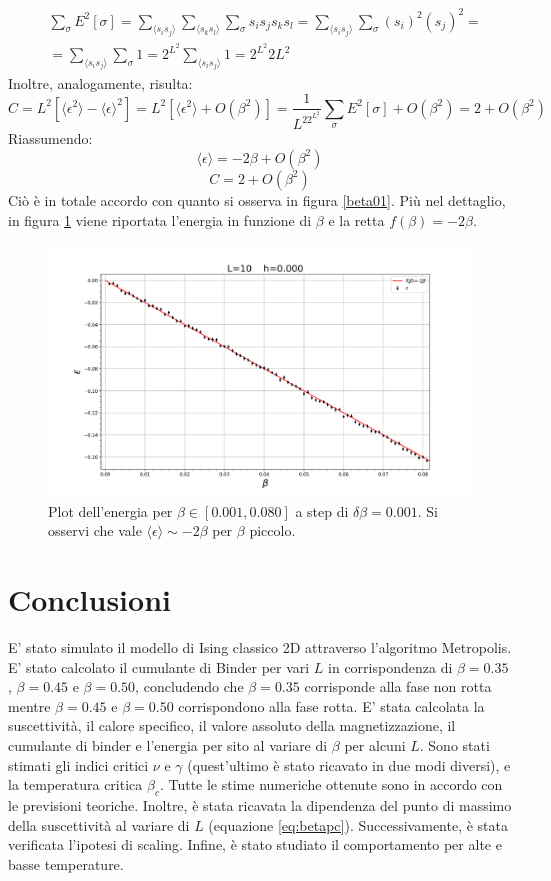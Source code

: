 \documentclass[10pt,a4paper]{article}
\begin{document}
\begin{align*}
&\sum_{\sigma}E^2[\sigma]=\sum_{\langle s_i s_j\rangle}\sum_{\langle s_k s_l\rangle}\sum_{\sigma}s_is_js_ks_l=\sum_{\langle s_i s_j\rangle}\sum_{\sigma}(s_i)^2(s_j)^2=\\&=\sum_{\langle s_i s_j\rangle}\sum_{\sigma}1=2^{L^2}\sum_{\langle s_i s_j\rangle}1=2^{L^2}2L^2
\end{align*}
Inoltre, analogamente, risulta:
$$C=L^2\left[\langle\epsilon^2\rangle-\langle\epsilon\rangle^2\right]=L^2\left[\langle\epsilon^2\rangle+O(\beta^2)\right]=\frac{1}{L^22^{L^2}}\sum_{\sigma}E^2[\sigma]+O(\beta^2)=2+O(\beta^2)$$
Riassumendo:
$$\langle\epsilon\rangle=-2\beta+O(\beta^2)$$
$$C=2+O(\beta^2)$$
Ciò è in totale accordo con quanto si osserva in figura \ref{beta01}. Più nel dettaglio, in figura \ref{enebeta0} viene riportata l'energia in funzione di $\beta$ e la retta $f(\beta)=-2\beta$.

\begin{figure}[h!]
	\centering
	\includegraphics[width=1\linewidth]{enebeta0}
	\caption{Plot dell'energia per $\beta\in[0.001,0.080]$ a step di $\delta\beta=0.001$. Si osservi che vale $\langle\epsilon\rangle\sim -2\beta$ per $\beta$ piccolo.}
	\label{enebeta0}
\end{figure}




 

\section{Conclusioni}
E' stato simulato il modello di Ising classico 2D attraverso l'algoritmo Metropolis. E' stato calcolato il cumulante di Binder per vari $L$ in corrispondenza di $\beta=0.35$, $\beta=0.45$ e $\beta=0.50$, concludendo che $\beta=0.35$ corrisponde alla fase non rotta mentre $\beta=0.45$ e $\beta=0.50$ corrispondono alla fase rotta. E' stata calcolata la suscettività, il calore specifico, il valore assoluto della magnetizzazione, il cumulante di binder e l'energia per sito al variare di $\beta$ per alcuni $L$. Sono stati stimati gli indici critici $\nu$ e $\gamma$ (quest'ultimo è stato ricavato in due modi diversi), e la temperatura critica $\beta_c$. Tutte le stime numeriche ottenute sono in accordo con le previsioni teoriche. Inoltre, è stata ricavata la dipendenza del punto di massimo della suscettività al variare di $L$ (equazione \ref{eq:betapc}). Successivamente, è stata verificata l'ipotesi di scaling. Infine, è stato studiato il comportamento per alte e basse temperature. 
\newpage
\end{document}
